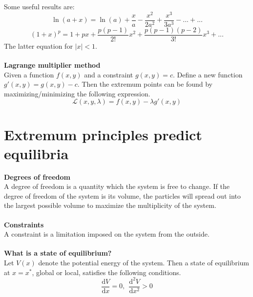 \documentclass[8pt]{article}
\numberwithin{equation}{section}
\begin{document}
\begin{multicols}{2}
Some useful results are: 
\begin{equation} \tag{J.4}
\ln{(a+x)}=\ln{(a)}+\frac{x}{a}-\frac{x^{2}}{2a^{2}}+\frac{x^{3}}{3a^{3}}-...+...
\end{equation}
\begin{equation} \tag{J.6}
(1+x)^{p}=1+px+\frac{p(p-1)}{2!}x^{2}+\frac{p(p-1)(p-2)}{3!}x^{3}+...
\end{equation}
The latter equation for $|x|<1$. \\ \\ 
\textbf{Lagrange multiplier method} \\
Given a function $f(x,y)$ and a constraint $g(x,y)=c$. Define a new function $g'(x,y)=g(x,y)-c$. Then the extremum points can be found by maximizing/minimizing the following expression.  
\begin{equation*}
\mathscr{L}(x,y,\lambda)=f(x,y)-\lambda g'(x,y)
\end{equation*}
\section{Extremum principles predict equilibria}
\textbf{Degrees of freedom}\\
A degree of freedom is a quantity which the system is free to change. If the degree of freedom of the system is its volume, the particles will spread out into the largest possible volume to maximize the multiplicity of the system.  \\\\
\textbf{Constraints} \\
A constraint is a limitation imposed on the system from the outside. \\\\
\textbf{What is a state of equilibrium?} \\
Let $V(x)$ denote the potential energy of the system. Then a state of equilibrium at $x=x^{*}$, global or local, satisfies the following conditions. 
\begin{equation}
\frac{\mathrm{d}V}{\mathrm{d}x}=0, \ \ \frac{\mathrm{d}^{2}V}{\mathrm{d}x^{2}}>0 \tag{2.2}
\end{equation}

\end{multicols}
\end{document}
